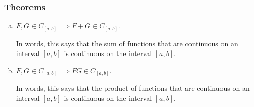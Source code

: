 \documentclass[12pt]{article}
\newenvironment{alphalist}{
  \begin{enumerate}[(a)]
    \addtolength{\itemsep}{-0.5\itemsep}}
  {\end{enumerate}}
\begin{document}
\subsubsection*{Theorems}

\begin{alphalist}  


\item $F, G \in C_{[a,b]}  \implies F+G \in C_{[a,b]}$. 

In words, this says that the sum of  functions that are continuous on an
interval $[a,b]$ is continuous on the interval $[a,b]$.

\item $F, G \in C_{[a,b]} \implies F G \in C_{[a,b]}$. 

In words, this says that the product of  functions that are continuous on an
interval $[a,b]$ is  continuous on the interval $[a,b]$.

\end{alphalist}
\end{document}

